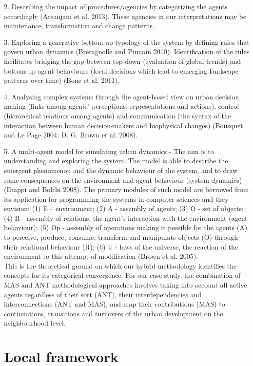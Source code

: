 \documentclass[11pt]{report}
\begin{document}
2.	Describing the impact of procedures/agencies by categorizing the agents accordingly (Arsanjani et al. 2013). These agencies in our interpretations may be maintenance, transformation and change patterns.

3.	Exploring a generative bottom-up typology of the system by defining rules that govern urban dynamics (Bretagnolle and Pumain 2010). Identification of the rules facilitates bridging the gap between top-down (evaluation of global trends) and bottom-up agent behaviours (local decisions which lead to emerging landscape patterns over time) (Bone et al. 2011). 

4.	Analysing complex systems through the agent-based view on urban decision making (links among agents' perceptions, representations and actions), control (hierarchical relations among agents) and communication (the syntax of the interaction between human decision-makers and biophysical changes) (Bousquet and Le Page 2004; D. G. Brown et al. 2008).

5.	A multi-agent model for simulating urban dynamics - The aim is to understanding and exploring the system. The model is able to describe the emergent phenomenon and the dynamic behaviour of the system,  and to draw some consequences on the environment and agent behaviour (system dynamics) (Diappi and Bolchi 2008). The primary modules of such model are borrowed from its application for programming the systems in computer sciences and they envision: (1) E – environment; (2)  A - assembly of agents; (3) O - set of objects; (4) R - assembly of relations, the agent’s interaction with the environment (agent behaviour); (5) Op - assembly of operations making it possible for the agents (A) to perceive, produce, consume, transform and manipulate objects (O) through their relational behaviour (R); (6) U - laws of the universe, the reaction  of  the  environment  to  this  attempt  of  modification (Brown et al. 2005).
\\
This is the theoretical ground on which our hybrid methodology identifies the concepts for its categorical convergence. For our case study, the combination of MAS and ANT methodological approaches involves taking into account all active agents regardless of their sort (ANT), their interdependencies and interconnections (ANT and MAS), and map their contributions (MAS) to continuations, transitions and turnovers of the urban development on the neighbourhood level.

\section{Local framework}
\end{document}
